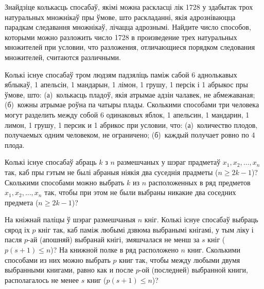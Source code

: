 \begin{problemList}
\smallskip

\problemItemSimple
{Знайдзіце колькасць спосабаў, якімі можна раскласці лік 1728 у здабытак
трох натуральных множнікаў пры ўмове, што раскладанні, якія адрозніваюцца парадкам
следавання множнікаў, лічацца адрознымі.}
{Найдите число способов, которыми можно разложить число 1728 в
произведение трех натуральных множителей при условии, что разложения,
отличающиеся порядком следования множителей, считаются различными.}

\bigskip

\problemItemSimple
{Колькі існуе спосабаў тром людзям падзяліць паміж сабой 6 аднолькавых яблыкаў,
1 апельсін, 1 мандарын, 1 лімон, 1 грушу, 1 персік і 1 абрыкос пры ўмове, што:
(а)~колькасць пладоў, якія атрымае адзін чалавек, не абмежаваная; (б)~кожны атрымае
роўна па чатыры плады.}
{Сколькими способами три человека могут разделить между собой 6
одинаковых яблок, 1 апельсин, 1 мандарин, 1 лимон, 1 грушу, 1 персик
и 1 абрикос при условии, что: (а)~количество плодов, получаемых одним
человеком, не ограничено; (б)~каждый получает ровно по 4 плода.}

\bigskip

\problemItemSimple
{Колькі існуе спосабаў абраць $k$ з $n$ размешчаных у шэраг прадметаў
$x_1, x_2, \dots, x_n$ так, каб пры гэтым не былі абраныя ніякія два
суседнія прадметы ($n \ge 2k - 1$)?}
{Сколькими способами можно выбрать $k$ из $n$ расположенных в ряд
предметов $x_1, x_2, \dots, x_n$ так, чтобы при этом не были выбраны
никакие два соседних предмета ($n \ge 2k - 1$)?}

\bigskip

\problemItemSimple
{На кніжнай паліцы ў шэраг размешчаныя $n$ кніг. Колькі існуе спосабаў выбраць
сярод іх $p$ кніг так, каб паміж любымі дзвюма выбранымі кнігамі, у тым ліку
і пасля $p$-ай (апошняй) выбранай кнігі, змяшчалася не менш за $s$ кніг
($p(s + 1) \le n$)?}
{На книжной полке в ряд расположено $n$ книг. Сколькими способами из
них можно выбрать $p$ книг так, чтобы между любыми двумя выбранными
книгами, равно как и после $p$-ой (последней) выбранной книги,
располагалось не менее $s$ книг ($p(s + 1) \le n$)?}

\end{problemList}


